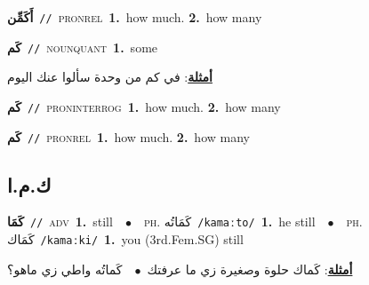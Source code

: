 \documentclass[10pt,a4paper,twoside]{article} %
\begin{document}
\begin{multicols}{2}
{\setlength\topsep{0pt}\textbf{\foreignlanguage{arabic}{أَكَمِّن}}\ {\color{gray}\texttt{//}\color{black}}\ \textsc{pron\textunderscore rel}\ \textbf{1.}~how much.  \textbf{2.}~how many\ } \vspace{2mm}

{\setlength\topsep{0pt}\textbf{\foreignlanguage{arabic}{كَم}}\ {\color{gray}\texttt{//}\color{black}}\ \textsc{noun\textunderscore quant}\ \textbf{1.}~some\  \begin{flushright}\color{gray}\foreignlanguage{arabic}{\textbf{\underline{\foreignlanguage{arabic}{أمثلة}}}: في كم من وحدة سألوا عنك اليوم}\end{flushright}\color{black}} \vspace{2mm}

{\setlength\topsep{0pt}\textbf{\foreignlanguage{arabic}{كَم}}\ {\color{gray}\texttt{//}\color{black}}\ \textsc{pron\textunderscore interrog}\ \textbf{1.}~how much.  \textbf{2.}~how many\ } \vspace{2mm}

{\setlength\topsep{0pt}\textbf{\foreignlanguage{arabic}{كَم}}\ {\color{gray}\texttt{//}\color{black}}\ \textsc{pron\textunderscore rel}\ \textbf{1.}~how much.  \textbf{2.}~how many\ } \vspace{2mm}

\vspace{-3mm}
\subsection*{\color{blue}\foreignlanguage{arabic}{ك.م.ا}\color{blue}{ (ntws)}} 

{\setlength\topsep{0pt}\textbf{\foreignlanguage{arabic}{كَمَا}}\ {\color{gray}\texttt{//}\color{black}}\ \textsc{adv}\ \textbf{1.}~still\ \ $\bullet$\ \ \textsc{ph.} \color{gray} \foreignlanguage{arabic}{كَمَاتُه}\color{black}\ {\color{gray}\texttt{/{\sffamily kamaːto}/}\color{black}}\ \textbf{1.}~he still\ \ $\bullet$\ \ \textsc{ph.} \color{gray} \foreignlanguage{arabic}{كَمَاك}\color{black}\ {\color{gray}\texttt{/{\sffamily kamaːki}/}\color{black}}\ \textbf{1.}~you (3rd.Fem.SG) still\  \begin{flushright}\color{gray}\foreignlanguage{arabic}{\textbf{\underline{\foreignlanguage{arabic}{أمثلة}}}: كَماك حلوة وصغيرة زي ما عرفتك\ $\bullet$\ \  كَماتُه واطي زي ماهو؟}\end{flushright}\color{black}} \vspace{2mm}


\end{multicols}
\end{document}
